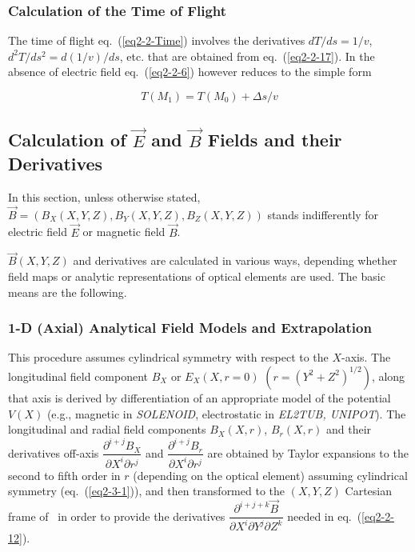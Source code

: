 \subsubsection{Calculation of the Time of Flight \label{CalcTOF}} 

The time of flight  eq.~(\ref{eq2-2-Time}) involves the derivatives 
$dT/ds=1/v$, $d^2T/ds^2=d(1/v)/ds$, etc. that are obtained from eq.~(\ref{eq2-2-17}). In the absence of 
electric field   eq.~(\ref{eq2-2-6}) however reduces to the simple form 

 \begin{equation}
T(M_1) =   T(M_0) +  \Delta s/v  
 \end{equation}


\subsection{Calculation of  $ \vec E$ and $ \vec B $ Fields and their Derivatives}\label{sec2.3}    %

In this section, unless otherwise stated, $ \vec  B = (B_X(X,Y,Z),B_Y(X,Y,Z),B_Z(X,Y,Z)) $ stands 
indifferently for electric field $\vec E$  or magnetic field $\vec B$. 


\noindent $ \vec  B(X,Y,Z) $ and 
derivatives are calculated in various ways, depending  whether field maps or analytic
 representations of optical elements are  used. The  basic means are the following. 
 

\subsubsection{1-D (Axial) Analytical Field Models and Extrapolation} \label{sec2.5.2}


This procedure assumes cylindrical symmetry with respect to the $ X$-axis.
 The longitudinal field component $ B_X \textrm{~or~} E_X(X,r=0) $ $ (r=(Y^2+Z^2)^{1/2}) $,
along that axis is derived by differentiation of an appropriate 
model of the  potential $ V(X) $ (e.g., magnetic in \textsl{SOLENOID}, electrostatic in \textsl{EL2TUB, 
UNIPOT}). 
The longitudinal and radial field components $ B_X(X,r)$,  $ B_r(X,r) $ and 
their derivatives off-axis 
$  \dfrac{ \partial^{i+j}B_X }{ \partial X^i\partial r^j} $ and 
$  \dfrac{ \partial^{ i+j} B_r }{ \partial X^i\partial r^j} $  are obtained by 
Taylor expansions to the second to fifth order in $ r $ (depending on the optical element) assuming cylindrical 
symmetry (eq.~(\ref{eq2-3-1})), and then transformed to the $ (X,Y,Z) $ 
Cartesian frame of \zgou\ in order to provide the derivatives 
$ \dfrac{ \partial^{i+j+k} \vec  B }{ \partial X^i\partial Y^j\partial Z^k} $ 
needed in eq.~(\ref{eq2-2-12}).




